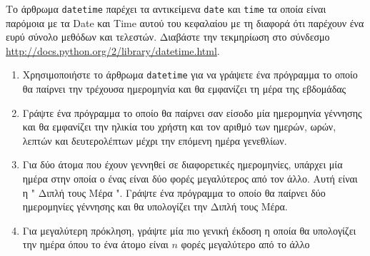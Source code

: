 \documentclass[10pt]{book}
\begin{document}




\begin{exercise}

Το άρθρωμα  {\tt datetime}  παρέχει τα αντικείμενα  {\tt date}  και  {\tt time}  τα οποία είναι παρόμοια με τα  Date  και  Time  αυτού του κεφαλαίου με τη διαφορά ότι παρέχουν ένα ευρύ σύνολο μεθόδων και τελεστών. Διαβάστε την τεκμηρίωση στο σύνδεσμο \url{http://docs.python.org/2/library/datetime.html}. 

\begin{enumerate}

\item Χρησιμοποιήστε το άρθρωμα  {\tt datetime}  για να γράψετε ένα πρόγραμμα το 
  οποίο θα παίρνει την τρέχουσα ημερομηνία και θα εμφανίζει τη μέρα της εβδομάδας

\item Γράψτε ένα πρόγραμμα το οποίο θα παίρνει σαν είσοδο μία ημερομηνία γέννησης 
  και θα εμφανίζει την ηλικία του χρήστη και τον αριθμό των ημερών, ωρών, λεπτών και 
  δευτερολέπτων μέχρι την επόμενη ημέρα γενεθλίων.

\item Για δύο άτομα που έχουν γεννηθεί σε διαφορετικές ημερομηνίες, υπάρχει μία ημέρα στην  
  οποία ο ένας είναι δύο φορές μεγαλύτερος από τον άλλο. Αυτή είναι η  " Διπλή τους 
  Μέρα ".   Γράψτε ένα πρόγραμμα το οποίο θα παίρνει δύο ημερομηνίες γέννησης και θα 
  υπολογίζει την Διπλή τους Μέρα.

\item Για μεγαλύτερη πρόκληση, γράψτε μία πιο γενική έκδοση η οποία θα υπολογίζει την 
  ημέρα όπου το ένα άτομο είναι $n$ φορές μεγαλύτερο από το άλλο

\end{enumerate}

\end{exercise}
\end{document}
